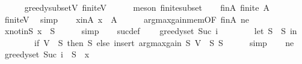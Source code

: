 \begin{isabellebody}
\ \ \ \ \isamarkupfalse%
\ greedy{\isacharunderscore}{\kern0pt}subset{\isacharunderscore}{\kern0pt}V\ finite{\isacharunderscore}{\kern0pt}V\isanewline
\ \ \ \ \isamarkupfalse%
\ {\isacharparenleft}{\kern0pt}meson\ finite{\isacharunderscore}{\kern0pt}subset{\isacharparenright}{\kern0pt}\isanewline
\isanewline
\ \ \isamarkupfalse%
\ finA{\isacharcolon}{\kern0pt}\ {\isachardoublequoteopen}finite\ {\isacharquery}{\kern0pt}A{\isachardoublequoteclose}\isanewline
\ \ \ \ \isamarkupfalse%
\ finite{\isacharunderscore}{\kern0pt}V\ \isamarkupfalse%
\ simp\isanewline
\isanewline
\ \ \isamarkupfalse%
\ x{\isacharunderscore}{\kern0pt}in{\isacharunderscore}{\kern0pt}A{\isacharcolon}{\kern0pt}\ {\isachardoublequoteopen}{\isacharquery}{\kern0pt}x\ {\isasymin}\ {\isacharquery}{\kern0pt}A{\isachardoublequoteclose}\isanewline
\ \ \ \ \isamarkupfalse%
\ argmax{\isacharunderscore}{\kern0pt}gain{\isacharunderscore}{\kern0pt}mem{\isacharbrackleft}{\kern0pt}OF\ finA\ ne{\isacharbrackright}{\kern0pt}\ \isakeywordONE{{\isachardot}{\kern0pt}}\isamarkupfalse%
\isanewline
\ \ \isamarkupfalse%
\ x{\isacharunderscore}{\kern0pt}notin{\isacharunderscore}{\kern0pt}S{\isacharcolon}{\kern0pt}\ {\isachardoublequoteopen}{\isacharquery}{\kern0pt}x\ {\isasymnotin}\ {\isacharquery}{\kern0pt}S{\isachardoublequoteclose}\isanewline
\ \ \ \ \isamarkupfalse%
\ simp\isanewline
\isanewline
\ \ \isamarkupfalse%
\ suc{\isacharunderscore}{\kern0pt}def{\isacharcolon}{\kern0pt}\isanewline
\ \ \ \ {\isachardoublequoteopen}greedy{\isacharunderscore}{\kern0pt}set\ {\isacharparenleft}{\kern0pt}Suc\ i{\isacharparenright}{\kern0pt}\ {\isacharequal}{\kern0pt}\isanewline
\ \ \ \ \ \ \ {\isacharparenleft}{\kern0pt}let\ S\ {\isacharequal}{\kern0pt}\ {\isacharquery}{\kern0pt}S\ in\isanewline
\ \ \ \ \ \ \ \ if\ V\ {\isasymsubseteq}\ S\ then\ S\ else\ insert\ {\isacharparenleft}{\kern0pt}argmax{\isacharunderscore}{\kern0pt}gain\ S\ {\isacharparenleft}{\kern0pt}V\ {\isacharminus}{\kern0pt}\ S{\isacharparenright}{\kern0pt}{\isacharparenright}{\kern0pt}\ S{\isacharparenright}{\kern0pt}{\isachardoublequoteclose}\isanewline
\ \ \ \ \isamarkupfalse%
\ simp\isanewline
\isanewline
\ \ \isamarkupfalse%
\ ne\ \isamarkupfalse%
\ {\isachardoublequoteopen}greedy{\isacharunderscore}{\kern0pt}set\ {\isacharparenleft}{\kern0pt}Suc\ i{\isacharparenright}{\kern0pt}\ {\isacharequal}{\kern0pt}\ {\isacharquery}{\kern0pt}S\ {\isasymunion}\ {\isacharbraceleft}{\kern0pt}{\isacharquery}{\kern0pt}x{\isacharbraceright}{\kern0pt}{\isachardoublequoteclose}\isanewline

\end{isabellebody}
